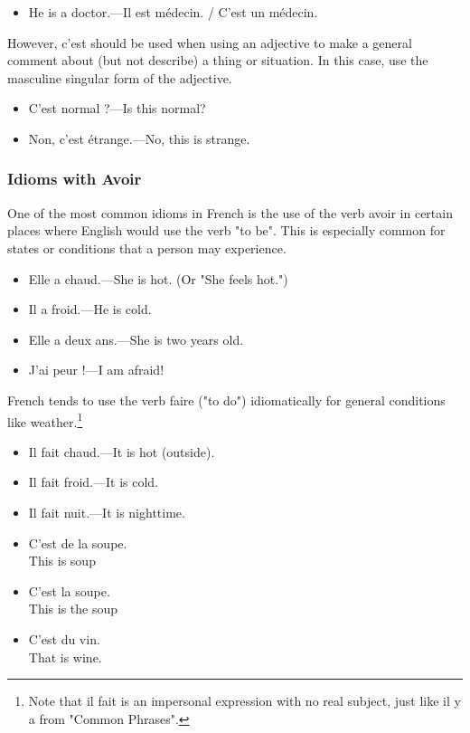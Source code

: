 \begin{itemize}
  \item  He is a doctor.---Il est m{\'e}decin. / C'est un m{\'e}decin.
\end{itemize}

However, c'est should be used when using an adjective to make a general comment about (but not describe) a thing or situation. In this case, use the masculine singular form of the adjective.

\begin{itemize}
  \item  C'est normal ?---Is this normal?
  \item  Non, c'est {\'e}trange.---No, this is strange.
\end{itemize}

\subsubsection{Idioms with Avoir}

One of the most common idioms in French is the use of the verb avoir in certain places where English would use the verb "to be". This is especially common for states or conditions that a person may experience.

\begin{itemize}
  \item  Elle a chaud.---She is hot. (Or "She feels hot.")
  \item  Il a froid.---He is cold.
  \item  Elle a deux ans.---She is two years old.
  \item  J'ai peur !---I am afraid!
\end{itemize}

French tends to use the verb faire ("to do") idiomatically for general conditions like weather.\footnote{Note that il fait is an impersonal expression with no real subject, just like il y a from "Common Phrases".}

\begin{itemize}
  \item  Il fait chaud.---It is hot (outside).
  \item  Il fait froid.---It is cold.
  \item  Il fait nuit.---It is nighttime.
\end{itemize}

\begin{itemize}
  \item  C'est de la soupe. \\ This is soup
  \item  C'est la soupe. \\ This is the soup
  \item  C'est du vin. \\ That is wine.
\end{itemize}


